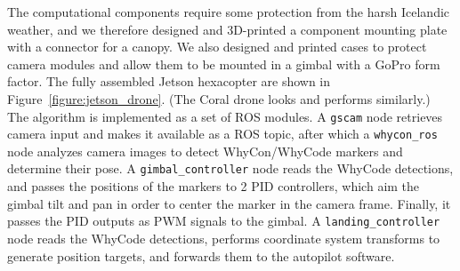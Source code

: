 The computational components require some protection from the harsh Icelandic weather,
and we therefore designed and 3D-printed a component mounting plate with a connector for a canopy.
We also designed and printed cases to protect camera modules and allow them to be mounted in a gimbal with a GoPro form factor.
The fully assembled Jetson hexacopter are shown in Figure~\ref{figure:jetson_drone}.
(The Coral drone looks and performs similarly.)
The algorithm is implemented as a set of ROS modules.
A \texttt{gscam} node retrieves camera input and makes it available as a ROS topic,
after which a \texttt{whycon\_ros} node analyzes camera images to detect WhyCon/WhyCode markers and determine their pose.
A \texttt{gimbal\_controller} node reads the WhyCode detections, and passes the positions of the markers to 2 PID controllers,
which aim the gimbal tilt and pan in order to center the marker in the camera frame.
Finally, it passes the PID outputs as PWM signals to the gimbal.
A \texttt{landing\_controller} node reads the WhyCode detections,
performs coordinate system transforms to generate position targets,
and forwards them to the autopilot software.

